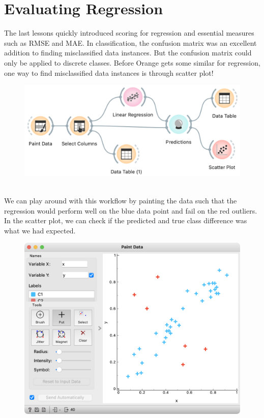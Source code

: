 \chapter{Evaluating Regression}
\label{ch:reg-eval}

The last lessons quickly introduced scoring for regression and essential measures such as RMSE and MAE. In classification, the confusion matrix was an excellent addition to finding misclassified data instances. But the confusion matrix could only be applied to discrete classes. Before Orange gets some similar for regression, one way to find misclassified data instances is through scatter plot!



\begin{figure}[h]
    \centering
    \includegraphics[scale=0.5]{workflow-predictions.png}
    \caption{$\;$}
\end{figure}

We can play around with this workflow by painting the data such that the regression would perform well on the blue data point and fail on the red outliers. In the scatter plot, we can check if the predicted and true class difference was what we had expected.

\begin{figure}[h]
    \centering
    \includegraphics[scale=0.5]{paint.png}
    \caption{$\;$}
\end{figure}

